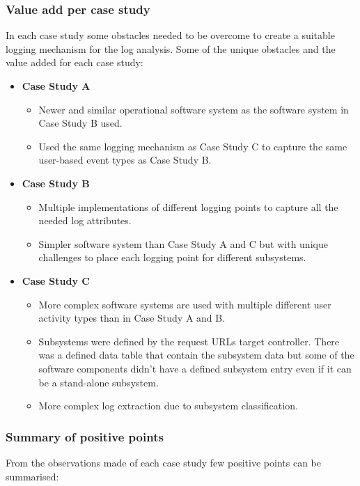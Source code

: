 \subsubsection{Value add per case study}
In each case study some obstacles needed to be overcome to create a suitable logging mechanism for the log analysis. Some of the unique obstacles and the value added for each case study:

\begin{itemize}
	\item \textbf{Case Study A}
		\begin{itemize}
			\item Newer and similar operational software system as the software system in Case Study B used.
			\item Used the same logging mechanism as Case Study C to capture the same user-based event types as Case Study B.
		\end{itemize}
	\item \textbf{Case Study B}
	\begin{itemize}
		\item Multiple implementations of different logging points to capture all the needed log attributes.
		\item Simpler software system than Case Study A and C but with unique challenges to place each logging point for different subsystems.
	\end{itemize}
	\item \textbf{Case Study C}
	\begin{itemize}
		\item More complex software systems are used with multiple different user activity types than in Case Study A and B.
		\item Subsystems were defined by the request URLs target controller. There was a defined data table that contain the subsystem data but some of the software components didn't have a defined subsystem entry even if it can be a stand-alone subsystem.
		\item More complex log extraction due to subsystem classification.
	\end{itemize}
\end{itemize}

\subsubsection{Summary of positive points}
From the observations made of each case study few positive points can be summarised:

